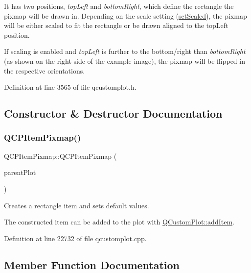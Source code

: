  It has two positions, {\itshape top\+Left} and {\itshape bottom\+Right}, which define the rectangle the pixmap will be drawn in. Depending on the scale setting (\hyperlink{class_q_c_p_item_pixmap_ab4d44529a1c6c8d37d0ea7560e042777}{set\+Scaled}), the pixmap will be either scaled to fit the rectangle or be drawn aligned to the top\+Left position.

If scaling is enabled and {\itshape top\+Left} is further to the bottom/right than {\itshape bottom\+Right} (as shown on the right side of the example image), the pixmap will be flipped in the respective orientations. 

Definition at line 3565 of file qcustomplot.\+h.



\subsection{Constructor \& Destructor Documentation}
\mbox{\label{class_q_c_p_item_pixmap_aa6de42a37261b21a5480e7da122345c3}} 
\subsubsection{\texorpdfstring{Q\+C\+P\+Item\+Pixmap()}{QCPItemPixmap()}}
{\footnotesize\ttfamily Q\+C\+P\+Item\+Pixmap\+::\+Q\+C\+P\+Item\+Pixmap (\begin{DoxyParamCaption}\item[{\hyperlink{class_q_custom_plot}{Q\+Custom\+Plot} $\ast$}]{parent\+Plot }\end{DoxyParamCaption})}

Creates a rectangle item and sets default values.

The constructed item can be added to the plot with \hyperlink{class_q_custom_plot_aa500620379262321685cb7a7674cbd2a}{Q\+Custom\+Plot\+::add\+Item}. 

Definition at line 22732 of file qcustomplot.\+cpp.



\subsection{Member Function Documentation}
\mbox{\label{class_q_c_p_item_pixmap_a7583a98ebd3f35d2ac5d6c05fad25a6c}} 
